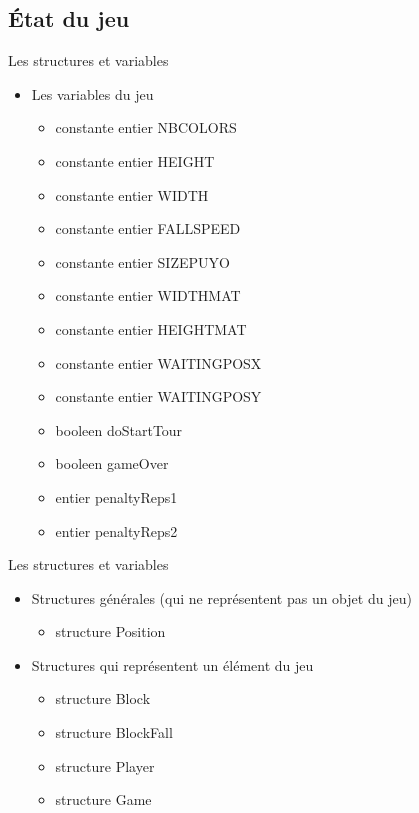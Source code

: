 \documentclass[10pt,dvipsnames,final]{beamer}
\begin{document}
\subsection{État du jeu}

\begin{frame}{Les structures et variables}
\begin{itemize}
\item Les variables du jeu
\begin{itemize}
\item constante entier NBCOLORS 
\item constante entier HEIGHT
\item constante entier WIDTH
\item constante entier FALLSPEED 
\item constante entier SIZEPUYO
\item constante entier WIDTHMAT
\item constante entier HEIGHTMAT
\item constante entier WAITINGPOSX
\item constante entier WAITINGPOSY
\item booleen doStartTour
\item booleen gameOver
\item entier penaltyReps1
\item entier penaltyReps2
\end{itemize}
\end{itemize}
\end{frame}

\begin{frame}{Les structures et variables}
\begin{itemize}
\item Structures générales (qui ne représentent pas un objet du jeu)
\begin{itemize}
\item structure Position
\end{itemize}
\item Structures qui représentent un élément du jeu
\begin{itemize}
\item structure Block
\item structure BlockFall
\item structure Player
\item structure Game
\end{itemize}
\end{itemize}
\end{frame}
\end{document}
